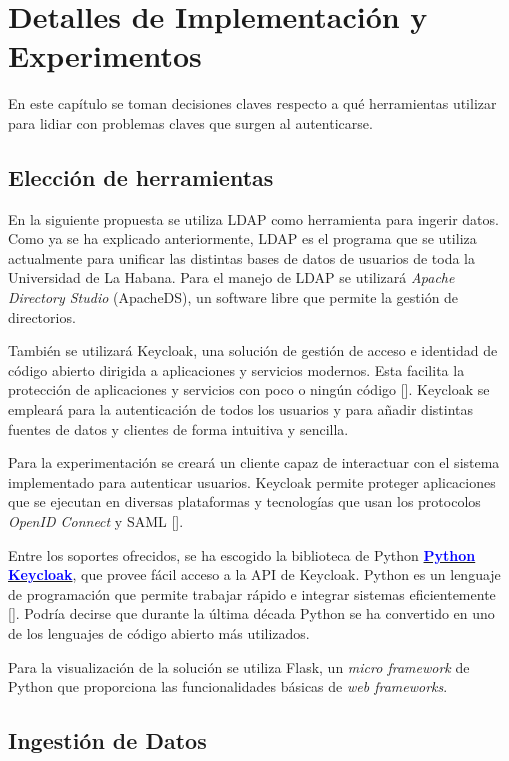 \chapter{Detalles de Implementación y Experimentos}\label{chapter:implementation}

En este capítulo se toman decisiones claves respecto a qué herramientas utilizar para lidiar con problemas claves que surgen al autenticarse.

\section*{Elección de herramientas}
En la siguiente propuesta se utiliza LDAP como herramienta para ingerir datos. Como ya se ha explicado anteriormente, LDAP es el programa que se utiliza actualmente para unificar las distintas bases de datos de usuarios de toda la Universidad de La Habana. Para el manejo de LDAP se utilizará \textit{Apache Directory Studio} (ApacheDS), un software libre que permite la gestión de directorios.

También se utilizará Keycloak, una solución de gestión de acceso e identidad de código abierto dirigida a aplicaciones y servicios modernos. Esta facilita la protección de aplicaciones y servicios con poco o ningún código [\cite{muyon2020metodos}]. Keycloak se empleará para la autenticación de todos los usuarios y para añadir distintas fuentes de datos y clientes de forma intuitiva y sencilla.

Para la experimentación se creará un cliente capaz de interactuar con el sistema implementado para autenticar usuarios. Keycloak permite proteger aplicaciones que se ejecutan en diversas plataformas y tecnologías que usan los protocolos \textit{OpenID Connect } y SAML [\cite{secure_apps_2022}]. 

Entre los soportes ofrecidos, se ha escogido la biblioteca de Python \href{https://pypi.org/project/python-keycloak/}{\textcolor{blue}{\textbf{Python Keycloak}}}, que provee fácil acceso a la API de Keycloak. Python es un lenguaje de programación que permite trabajar rápido e integrar sistemas eficientemente [\cite{python_2022}]. Podría decirse que durante la última década Python se ha convertido en uno de los lenguajes de código abierto más utilizados.

Para la visualización de la solución se utiliza Flask, un \textit{micro framework} de Python que proporciona las funcionalidades básicas de\textit{ web frameworks}.

\section*{Ingestión de Datos}

